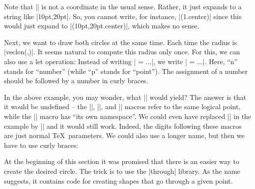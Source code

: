 Note that || is not a coordinate in the usual sense. Rather, it just expands
to a string like |10pt,20pt|. So, you cannot write, for instance,
|(\p1.center)| since this would just expand to |(10pt,20pt.center)|, which
makes no sense.

Next, we want to draw both circles at the same time. Each time the radius is
|veclen(,)|. It seems natural to compute this radius only once. For this,
we can also use a let operation: Instead of writing | = ...|, we write
| = ...|. Here, ``n'' stands for ``number'' (while ``p'' stands for
``point''). The assignment of a number should be followed by a number in curly
braces.
%
\begin{codeexample}[preamble={\usetikzlibrary{calc}}]
\end{codeexample}
%
In the above example, you may wonder, what || would yield? The answer is
that it would be undefined -- the |\p|, |\x|, and |\y| macros refer to the same
logical point, while the |\n| macro has ``its own namespace''. We could even
have replaced || in the example by || and it would still work. Indeed,
the digits following these macros are just normal \TeX\ parameters. We could
also use a longer name, but then we have to use curly braces:
%
\begin{codeexample}[preamble={\usetikzlibrary{calc}}]
\end{codeexample}

At the beginning of this section it was promised that there is an easier way to
create the desired circle. The trick is to use the |through| library. As the
name suggests, it contains code for creating shapes that go through a given
point.

